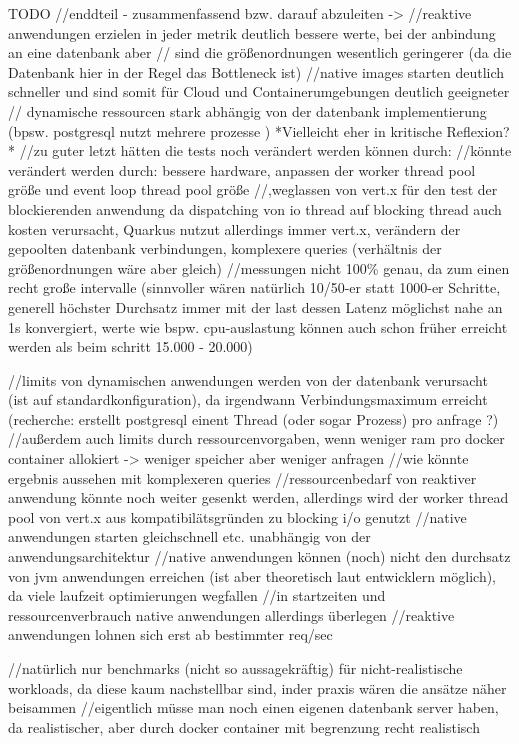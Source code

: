 TODO
//enddteil - zusammenfassend bzw. darauf abzuleiten ->
//reaktive anwendungen erzielen in jeder metrik deutlich bessere werte, bei der anbindung an eine datenbank aber
// sind die größenordnungen wesentlich geringerer (da die Datenbank hier in der Regel das Bottleneck ist)
//native images starten deutlich schneller und sind somit für Cloud und Containerumgebungen deutlich geeigneter
// dynamische ressourcen stark abhängig von der datenbank implementierung (bpsw. postgresql nutzt mehrere prozesse )
*Vielleicht eher in kritische Reflexion?*
//zu guter letzt hätten die tests noch verändert werden können durch:
//könnte verändert werden durch: bessere hardware, anpassen der worker thread pool größe und event loop thread pool größe
//,weglassen von vert.x für den test der blockierenden anwendung da dispatching von io thread auf blocking thread auch kosten verursacht, Quarkus
nutzut allerdings immer vert.x, verändern der gepoolten datenbank verbindungen, komplexere queries (verhältnis der größenordnungen wäre aber gleich)
//messungen nicht 100\% genau, da zum einen recht große intervalle (sinnvoller wären natürlich 10/50-er statt 1000-er Schritte,
generell höchster Durchsatz immer mit der last dessen Latenz möglichst nahe an 1s konvergiert,
werte wie bspw. cpu-auslastung können auch schon früher erreicht werden als beim schritt 15.000 - 20.000)


//limits von dynamischen anwendungen werden von der datenbank verursacht (ist auf standardkonfiguration), da irgendwann
Verbindungsmaximum erreicht (recherche: erstellt postgresql einent Thread (oder sogar Prozess) pro anfrage ?)
//außerdem auch limits durch ressourcenvorgaben, wenn weniger ram pro docker container allokiert -> weniger speicher aber weniger anfragen
//wie könnte ergebnis aussehen mit komplexeren queries
//ressourcenbedarf von reaktiver anwendung könnte noch weiter gesenkt werden, allerdings wird der worker thread pool von vert.x aus
kompatibilätsgründen zu blocking i/o genutzt
//native anwendungen starten gleichschnell etc. unabhängig von der anwendungsarchitektur
//native anwendungen können (noch) nicht den durchsatz von jvm anwendungen erreichen (ist aber theoretisch laut entwicklern möglich), da
viele laufzeit optimierungen wegfallen
//in startzeiten und ressourcenverbrauch native anwendungen allerdings überlegen
//reaktive anwendungen lohnen sich erst ab bestimmter req/sec

//natürlich nur benchmarks (nicht so aussagekräftig) für nicht-realistische workloads, da diese kaum nachstellbar sind,
inder praxis wären die ansätze näher beisammen
//eigentlich müsse man noch einen eigenen datenbank server haben, da realistischer, aber durch docker container mit begrenzung
recht realistisch
